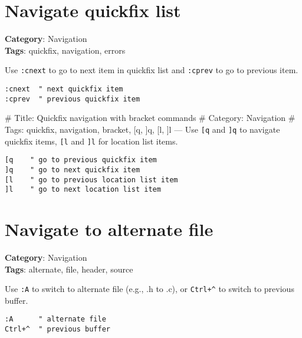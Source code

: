 {{{{{{{{{{\section{Navigate quickfix list}

\textbf{Category}: Navigation\\ \textbf{Tags}: quickfix, navigation, errors
\vspace{0.5cm}

Use {\footnotesize \Verb§:cnext§} to go to next item in quickfix list and {\footnotesize \Verb§:cprev§} to go to previous item.

\begin{Exa*}{}
\begin{Verbatim}[fontsize=\footnotesize, breaklines, breakanywhere]
:cnext  " next quickfix item
:cprev  " previous quickfix item
\end{Verbatim}
\end{Exa*}

\# Title: Quickfix navigation with bracket commands
\# Category: Navigation
\# Tags: quickfix, navigation, bracket, [q, ]q, [l, ]l
---
Use {\footnotesize \Verb§[q§} and {\footnotesize \Verb§]q§} to navigate quickfix items, {\footnotesize \Verb§[l§} and {\footnotesize \Verb§]l§} for location list items.

\begin{Exa*}{}
\begin{Verbatim}[fontsize=\footnotesize, breaklines, breakanywhere]
[q    " go to previous quickfix item
]q    " go to next quickfix item
[l    " go to previous location list item
]l    " go to next location list item
\end{Verbatim}
\end{Exa*}

\section{Navigate to alternate file}

\textbf{Category}: Navigation\\ \textbf{Tags}: alternate, file, header, source
\vspace{0.5cm}

Use {\footnotesize \Verb§:A§} to switch to alternate file (e.g., .h to .c), or {\footnotesize \Verb§Ctrl+^§} to switch to previous buffer.

\begin{Exa*}{}
\begin{Verbatim}[fontsize=\footnotesize, breaklines, breakanywhere]
:A      " alternate file
Ctrl+^  " previous buffer
\end{Verbatim}
\end{Exa*}

}}}}}}}}}}
